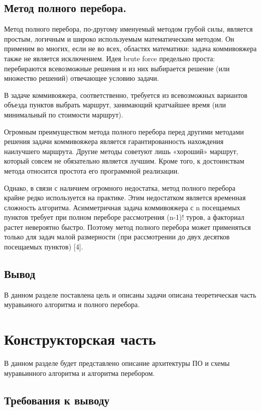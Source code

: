 \documentclass[a4paper,oneside,14pt]{extreport}
\begin{document}
\section{Метод полного перебора.}

Метод полного перебора, по-другому именуемый методом грубой силы, является простым, логичным и широко используемым
математическим методом. Он применим во многих, если не во всех,
областях математики: задача коммивояжера также не является исключением.
Идея brute force предельно проста: перебираются всевозможные
решения и из них выбирается решение (или множество решений) отвечающее
условию задачи.

В задаче коммивояжера, соответственно, требуется из всевозможных
вариантов объезда пунктов выбрать маршрут, занимающий кратчайшее время
(или минимальный по стоимости маршрут).

Огромным преимуществом метода полного перебора перед другими
методами решения задачи коммивояжера является гарантированность
нахождения наилучшего маршрута. Другие методы советуют лишь
«хороший» маршрут, который совсем не обязательно является лучшим. Кроме
того, к достоинствам метода относится простота его программной реализации.

Однако, в связи с наличием огромного недостатка, метод полного
перебора крайне редко используется на практике. Этим недостатком является
временная сложность алгоритма. Асимметричная задача коммивояжера с n
посещаемых пунктов требует при полном переборе рассмотрения (n-1)! туров,
а факториал растет невероятно быстро. Поэтому метод полного перебора может применяться только для задач
малой размерности (при рассмотрении до двух десятков посещаемых
пунктов) [4].

\section*{Вывод}

В данном разделе поставлена цель и описаны задачи описана теоретическая часть муравьиного алгоритма и полного перебора.
\newpage

\chapter{Конструкторская часть}
В данном разделе будет представлено описание архитектуры ПО и схемы муравьинного алгоритма и алгоритма перебором.

\section{Требования к выводу}
\end{document}
